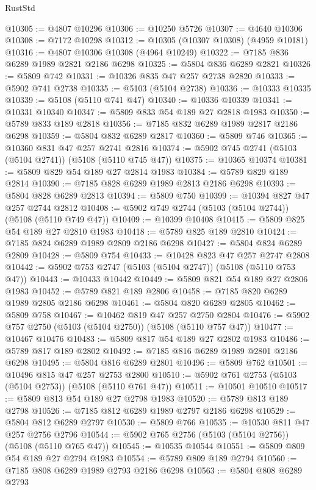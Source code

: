 \begin{lexlean}{RustStd}
\begin{coremodule}
@10305 := @4807 @10296
@10306 := @10250 @5726
@10307 := @4640 @10306
@10308 := @7172 @10298
@10312 := @10305 (@10307 @10308) (@4959 @10181)
@10316 := @4807 @10306 @10308 (@4964 @10249)
@10322 := @7185 @836 @6289 @1989 @2821 @2186 @6298
@10325 := @5804 @836 @6289 @2821
@10326 := @5809 @742
@10331 := @10326 @835 @47 @257 @2738 @2820
@10333 := @5902 @741 @2738
@10335 := @5103 (@5104 @2738)
@10336 := @10333 @10335
@10339 := @5108 (@5110 @741 @47)
@10340 := @10336 @10339
@10341 := @10331 @10340
@10347 := @5809 @833 @54 @189 @27 @2818 @1983
@10350 := @5789 @833 @189 @2818
@10356 := @7185 @832 @6289 @1989 @2817 @2186 @6298
@10359 := @5804 @832 @6289 @2817
@10360 := @5809 @746
@10365 := @10360 @831 @47 @257 @2741 @2816
@10374 := @5902 @745 @2741 (@5103 (@5104 @2741)) (@5108 (@5110 @745 @47))
@10375 := @10365 @10374
@10381 := @5809 @829 @54 @189 @27 @2814 @1983
@10384 := @5789 @829 @189 @2814
@10390 := @7185 @828 @6289 @1989 @2813 @2186 @6298
@10393 := @5804 @828 @6289 @2813
@10394 := @5809 @750
@10399 := @10394 @827 @47 @257 @2744 @2812
@10408 := @5902 @749 @2744 (@5103 (@5104 @2744)) (@5108 (@5110 @749 @47))
@10409 := @10399 @10408
@10415 := @5809 @825 @54 @189 @27 @2810 @1983
@10418 := @5789 @825 @189 @2810
@10424 := @7185 @824 @6289 @1989 @2809 @2186 @6298
@10427 := @5804 @824 @6289 @2809
@10428 := @5809 @754
@10433 := @10428 @823 @47 @257 @2747 @2808
@10442 := @5902 @753 @2747 (@5103 (@5104 @2747)) (@5108 (@5110 @753 @47))
@10443 := @10433 @10442
@10449 := @5809 @821 @54 @189 @27 @2806 @1983
@10452 := @5789 @821 @189 @2806
@10458 := @7185 @820 @6289 @1989 @2805 @2186 @6298
@10461 := @5804 @820 @6289 @2805
@10462 := @5809 @758
@10467 := @10462 @819 @47 @257 @2750 @2804
@10476 := @5902 @757 @2750 (@5103 (@5104 @2750)) (@5108 (@5110 @757 @47))
@10477 := @10467 @10476
@10483 := @5809 @817 @54 @189 @27 @2802 @1983
@10486 := @5789 @817 @189 @2802
@10492 := @7185 @816 @6289 @1989 @2801 @2186 @6298
@10495 := @5804 @816 @6289 @2801
@10496 := @5809 @762
@10501 := @10496 @815 @47 @257 @2753 @2800
@10510 := @5902 @761 @2753 (@5103 (@5104 @2753)) (@5108 (@5110 @761 @47))
@10511 := @10501 @10510
@10517 := @5809 @813 @54 @189 @27 @2798 @1983
@10520 := @5789 @813 @189 @2798
@10526 := @7185 @812 @6289 @1989 @2797 @2186 @6298
@10529 := @5804 @812 @6289 @2797
@10530 := @5809 @766
@10535 := @10530 @811 @47 @257 @2756 @2796
@10544 := @5902 @765 @2756 (@5103 (@5104 @2756)) (@5108 (@5110 @765 @47))
@10545 := @10535 @10544
@10551 := @5809 @809 @54 @189 @27 @2794 @1983
@10554 := @5789 @809 @189 @2794
@10560 := @7185 @808 @6289 @1989 @2793 @2186 @6298
@10563 := @5804 @808 @6289 @2793

\end{coremodule}
\end{lexlean}
